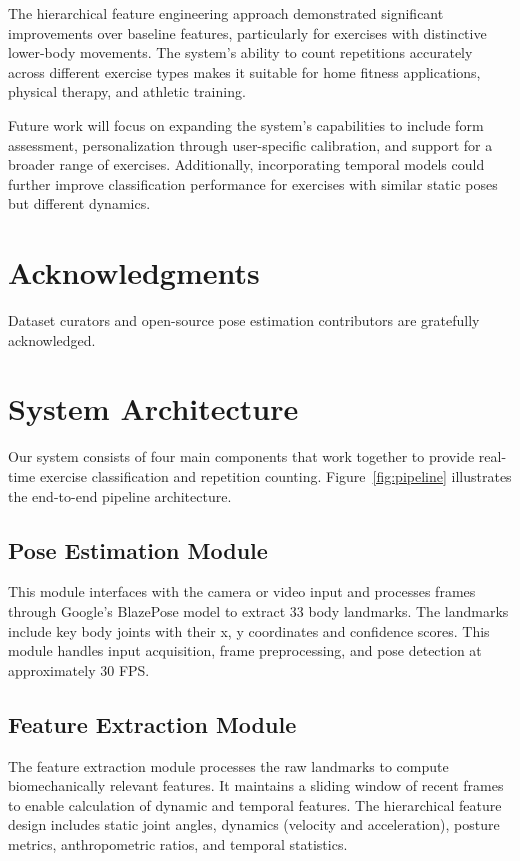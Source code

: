 \documentclass[conference]{IEEEtran}
\begin{document}
The hierarchical feature engineering approach demonstrated significant improvements over baseline features, particularly for exercises with distinctive lower-body movements. The system's ability to count repetitions accurately across different exercise types makes it suitable for home fitness applications, physical therapy, and athletic training.

Future work will focus on expanding the system's capabilities to include form assessment, personalization through user-specific calibration, and support for a broader range of exercises. Additionally, incorporating temporal models could further improve classification performance for exercises with similar static poses but different dynamics.

\section*{Acknowledgments}
Dataset curators and open-source pose estimation contributors are gratefully acknowledged.

\section{System Architecture}
Our system consists of four main components that work together to provide real-time exercise classification and repetition counting. Figure~\ref{fig:pipeline} illustrates the end-to-end pipeline architecture.

\subsection{Pose Estimation Module}
This module interfaces with the camera or video input and processes frames through Google's BlazePose model to extract 33 body landmarks. The landmarks include key body joints with their x, y coordinates and confidence scores. This module handles input acquisition, frame preprocessing, and pose detection at approximately 30 FPS.

\subsection{Feature Extraction Module}
The feature extraction module processes the raw landmarks to compute biomechanically relevant features. It maintains a sliding window of recent frames to enable calculation of dynamic and temporal features. The hierarchical feature design includes static joint angles, dynamics (velocity and acceleration), posture metrics, anthropometric ratios, and temporal statistics.
\end{document}
